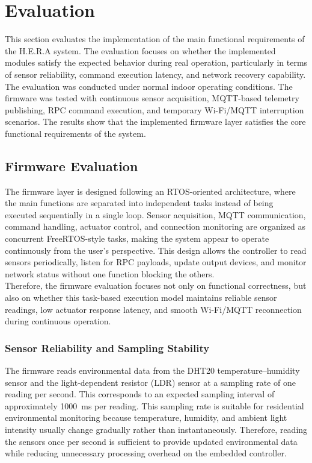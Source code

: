 \newpage
\section{Evaluation}
\label{sec:functional_requirement_evaluation}

This section evaluates the implementation of the main functional requirements of the H.E.R.A system. The evaluation focuses on whether the implemented modules satisfy the expected behavior during real operation, particularly in terms of sensor reliability, command execution latency, and network recovery capability. \\

The evaluation was conducted under normal indoor operating conditions. The firmware was tested with continuous sensor acquisition, MQTT-based telemetry publishing, RPC command execution, and temporary Wi-Fi/MQTT interruption scenarios. The results show that the implemented firmware layer satisfies the core functional requirements of the system.

\subsection{Firmware Evaluation}
\label{subsec:firmware_evaluation}

The firmware layer is designed following an RTOS-oriented architecture, where the main functions are separated into independent tasks instead of being executed sequentially in a single loop. Sensor acquisition, MQTT communication, command handling, actuator control, and connection monitoring are organized as concurrent FreeRTOS-style tasks, making the system appear to operate continuously from the user's perspective. This design allows the controller to read sensors periodically, listen for RPC payloads, update output devices, and monitor network status without one function blocking the others. \\

Therefore, the firmware evaluation focuses not only on functional correctness, but also on whether this task-based execution model maintains reliable sensor readings, low actuator response latency, and smooth Wi-Fi/MQTT reconnection during continuous operation.

\subsubsection{Sensor Reliability and Sampling Stability}

The firmware reads environmental data from the DHT20 temperature--humidity sensor and the light-dependent resistor (LDR) sensor at a sampling rate of one reading per second. This corresponds to an expected sampling interval of approximately 1000~ms per reading. This sampling rate is suitable for residential environmental monitoring because temperature, humidity, and ambient light intensity usually change gradually rather than instantaneously. Therefore, reading the sensors once per second is sufficient to provide updated environmental data while reducing unnecessary processing overhead on the embedded controller. \\

